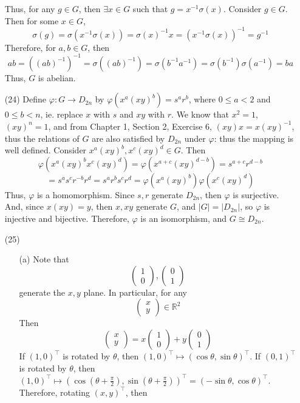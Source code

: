 \documentclass[12pt]{article}
\begin{document}
\begin{itemize}
Thus, for any $g \in G$, then $\exists x \in G$ such that $g = x^{-1}\sigma(x)$. Consider $g \in G$. Then for some $x \in G$,
$$\sigma(g) = \sigma(x^{-1}\sigma(x)) = \sigma(x)^{-1}x = (x^{-1}\sigma(x))^{-1} = g^{-1}$$
Therefore, for $a, b \in G$, then
$$ab = ((ab)^{-1})^{-1} = \sigma((ab)^{-1}) = \sigma(b^{-1}a^{-1}) = \sigma(b^{-1})\sigma(a^{-1}) = ba$$
Thus, $G$ is abelian.
\item[(24)]
Define $\varphi: G \rightarrow D_{2n}$ by $\varphi(x^a(xy)^b) = s^ar^b$, where $0 \leq a < 2$ and $0 \leq b < n$, ie. replace $x$ with $s$ and $xy$ with $r$. We know that $x^2 = 1$, $(xy)^n = 1$, and from Chapter 1, Section 2, Exercise 6, $(xy)x = x(xy)^{-1}$, thus the relations of $G$ are also satisfied by $D_{2n}$ under $\varphi$: thus the mapping is well defined. Consider $x^a(xy)^b, x^c(xy)^d \in G$. Then
$$\varphi(x^a(xy)^bx^c(xy)^d) = \varphi(x^{a+c}(xy)^{d - b}) = s^{a+c}r^{d - b}$$
$$= s^as^cr^{-b}r^d =  s^ar^bs^cr^d = \varphi(x^a(xy)^b)\varphi(x^c(xy)^d)$$
Thus, $\varphi$ is a homomorphism. Since $s, r$ generate $D_{2n}$, then $\varphi$ is surjective. And, since $x(xy) = y$, then $x, xy$ generate $G$, and $|G| = |D_{2n}|$, so $\varphi$ is injective and bijective. Therefore, $\varphi$ is an isomorphism, and $G \cong D_{2n}$.
\item[(25)]
\begin{itemize}
\item[(a)]
Note that 
$$\begin{pmatrix}
1 \\
0
\end{pmatrix}, \begin{pmatrix}
0 \\
1
\end{pmatrix}$$
generate the $x, y$ plane. In particular, for any
$$\begin{pmatrix}
x \\
y
\end{pmatrix} \in \mathbb{R}^2$$
Then
$$\begin{pmatrix}
x \\
y
\end{pmatrix} = x\begin{pmatrix}
1 \\
0
\end{pmatrix} + y\begin{pmatrix}
0 \\
1
\end{pmatrix}$$
If $(1, 0)^\top$ is rotated by $\theta$, then $(1, 0)^\top \mapsto (\cos\theta, \sin\theta)^\top$. If $(0, 1)^\top$ is rotated by $\theta$, then $(1, 0)^\top \mapsto (\cos(\theta + \frac{\pi}{2}), \sin(\theta + \frac{\pi}{2}))^\top = (-\sin\theta, \cos\theta)^\top$. Therefore, rotating $(x, y)^\top$, then

\end{itemize}
\end{itemize}
\end{document}
